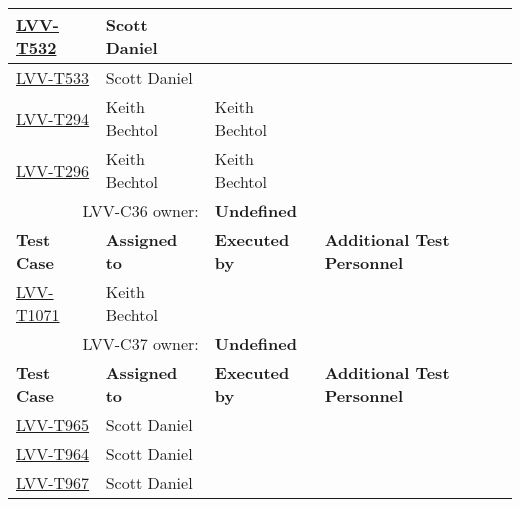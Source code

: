 \documentclass[DM,lsstdraft,STR,toc]{lsstdoc}
\begin{document}
\begin{longtable}{p{3cm}p{3cm}p{3cm}p{6cm}}
\href{https://jira.lsstcorp.org/secure/Tests.jspa#/testCase/LVV-T532}{LVV-T532}
& {\small Scott Daniel } & {\small  } &
\begin{minipage}[]{6cm}
\smallskip
{\small  }
\medskip
\end{minipage}
\\ \hline
\href{https://jira.lsstcorp.org/secure/Tests.jspa#/testCase/LVV-T533}{LVV-T533}
& {\small Scott Daniel } & {\small  } &
\begin{minipage}[]{6cm}
\smallskip
{\small  }
\medskip
\end{minipage}
\\ \hline
\href{https://jira.lsstcorp.org/secure/Tests.jspa#/testCase/LVV-T294}{LVV-T294}
& {\small Keith Bechtol } & {\small Keith Bechtol } &
\begin{minipage}[]{6cm}
\smallskip
{\small  }
\medskip
\end{minipage}
\\ \hline
\href{https://jira.lsstcorp.org/secure/Tests.jspa#/testCase/LVV-T296}{LVV-T296}
& {\small Keith Bechtol } & {\small Keith Bechtol } &
\begin{minipage}[]{6cm}
\smallskip
{\small  }
\medskip
\end{minipage}
\\ \hline
\multicolumn{2}{r}{ LVV-C36 owner:} &
\multicolumn{2}{l}{\textbf{
    Undefined
}
} \\\hline
\textbf{Test Case} & \textbf{Assigned to} & \textbf{Executed by} & \textbf{Additional Test Personnel} \\ \hline
\href{https://jira.lsstcorp.org/secure/Tests.jspa#/testCase/LVV-T1071}{LVV-T1071}
& {\small Keith Bechtol } & {\small  } &
\begin{minipage}[]{6cm}
\smallskip
{\small  }
\medskip
\end{minipage}
\\ \hline
\multicolumn{2}{r}{ LVV-C37 owner:} &
\multicolumn{2}{l}{\textbf{
    Undefined
}
} \\\hline
\textbf{Test Case} & \textbf{Assigned to} & \textbf{Executed by} & \textbf{Additional Test Personnel} \\ \hline
\href{https://jira.lsstcorp.org/secure/Tests.jspa#/testCase/LVV-T965}{LVV-T965}
& {\small Scott Daniel } & {\small  } &
\begin{minipage}[]{6cm}
\smallskip
{\small  }
\medskip
\end{minipage}
\\ \hline
\href{https://jira.lsstcorp.org/secure/Tests.jspa#/testCase/LVV-T964}{LVV-T964}
& {\small Scott Daniel } & {\small  } &
\begin{minipage}[]{6cm}
\smallskip
{\small  }
\medskip
\end{minipage}
\\ \hline
\href{https://jira.lsstcorp.org/secure/Tests.jspa#/testCase/LVV-T967}{LVV-T967}
& {\small Scott Daniel } & {\small  } &
\begin{minipage}[]{6cm}
\smallskip
{\small  }
\medskip
\end{minipage}
\\ \hline
\end{longtable}
\end{document}
